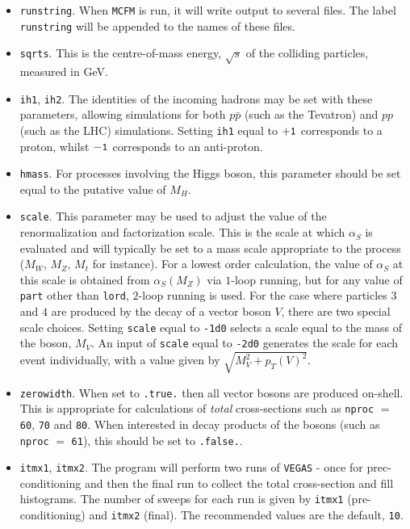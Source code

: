 \documentclass[12pt]{article}
\begin{document}
\begin{itemize}
\item {\tt runstring}.
When {\tt MCFM} is run, it will write output to several files. The
label {\tt runstring} will be appended to the names of these files.

\item {\tt sqrts}. This is the centre-of-mass energy, $\sqrt{s}$ of
the colliding particles, measured in GeV.

\item {\tt ih1}, {\tt ih2}. The identities of the incoming hadrons
may be set with these parameters, allowing simulations for both
$p{\bar p}$ (such as the Tevatron) and $pp$ (such as the LHC)
simulations. Setting {\tt ih1} equal to ${\tt +1}$ corresponds to
a proton, whilst ${\tt -1}$ corresponds to an anti-proton.

\item {\tt hmass}. For processes involving the Higgs boson, this
parameter should be set equal to the putative value of $M_H$.

\item {\tt scale}. This parameter may be used to adjust the value
of the renormalization and factorization scale. This is the scale
at which $\alpha_S$ is evaluated and will typically be set to
a mass scale appropriate to the process ($M_W$, $M_Z$, $M_t$ for
instance). For a lowest order calculation, the value of $\alpha_S$ at
this scale is obtained from $\alpha_S(M_Z)$ via $1$-loop running, but
for any value of {\tt part} other than {\tt lord}, $2$-loop
running is used.
For the case where particles $3$ and $4$ are produced by the decay of
a vector boson $V$, there are two special scale choices. Setting
{\tt scale} equal to {\tt -1d0} selects a scale equal to the mass of
the boson, $M_V$. An input of {\tt scale} equal to {\tt -2d0}
generates the scale for each event individually, with a value
given by $\sqrt{M_V^2+p_T(V)^2}$.

\item {\tt zerowidth}. When set to {\tt .true.} then all vector
bosons are produced on-shell. This is appropriate for calculations
of {\it total} cross-sections such as {\tt nproc} $=$ {\tt 60},
{\tt 70} and {\tt 80}. When interested in decay products of the
bosons (such as {\tt nproc} $=$ {\tt 61}), this should be set
to {\tt .false.}.

\item {\tt itmx1}, {\tt itmx2}. The program will perform two runs of
{\tt VEGAS} - once for prec-conditioning and then the final run to
collect the total cross-section and fill histograms. The number of
sweeps for each run is given by {\tt itmx1} (pre-conditioning)
and {\tt itmx2} (final). The recommended values are the default,
{\tt 10}.


\end{itemize}
\end{document}
